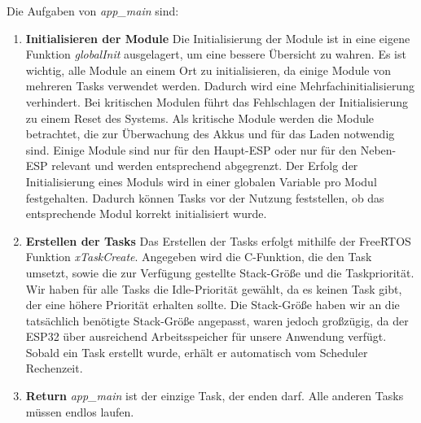 Die Aufgaben von \textit{app\_main} sind:
\begin{enumerate}
    \item \textbf{Initialisieren der Module}\newline
          Die Initialisierung der Module ist in eine eigene Funktion \textit{globalInit} ausgelagert, um eine bessere Übersicht zu wahren.
          Es ist wichtig, alle Module an einem Ort zu initialisieren, da einige Module von mehreren Tasks verwendet werden. 
          Dadurch wird eine Mehrfachinitialisierung verhindert.
          Bei kritischen Modulen führt das Fehlschlagen der Initialisierung zu einem Reset des Systems.
          Als kritische Module werden die Module betrachtet, die zur Überwachung des Akkus und für das Laden notwendig sind.
          Einige Module sind nur für den Haupt-ESP oder nur für den Neben-ESP relevant und werden entsprechend abgegrenzt.
          Der Erfolg der Initialisierung eines Moduls wird in einer globalen Variable pro Modul festgehalten.
          Dadurch können Tasks vor der Nutzung feststellen, ob das entsprechende Modul korrekt initialisiert wurde.
    \item \textbf{Erstellen der Tasks}\newline
          Das Erstellen der Tasks erfolgt mithilfe der FreeRTOS Funktion \textit{xTaskCreate}.
          Angegeben wird die C-Funktion, die den Task umsetzt, sowie die zur Verfügung gestellte Stack-Größe und die Taskpriorität.
          Wir haben für alle Tasks die Idle-Priorität gewählt, da es keinen Task gibt, der eine höhere Priorität erhalten sollte.
          Die Stack-Größe haben wir an die tatsächlich benötigte Stack-Größe angepasst, waren jedoch großzügig, da der ESP32 über ausreichend Arbeitsspeicher für unsere Anwendung verfügt.
          Sobald ein Task erstellt wurde, erhält er automatisch vom Scheduler Rechenzeit.
    \item \textbf{Return}\newline
          \textit{app\_main} ist der einzige Task, der enden darf.
          Alle anderen Tasks müssen endlos laufen.
\end{enumerate}


